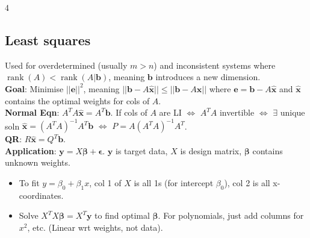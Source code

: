 \documentclass[9pt]{extarticle}
\begin{document}
\begin{multicols*}{4}
\subsection*{Least squares}
Used for overdetermined (usually $m>n$) and inconsistent systems where $\operatorname{rank}(A) < \operatorname{rank}(A|\mathbf{b})$, meaning $\mathbf{b}$ introduces a new dimension.\\
\textbf{Goal}: Minimise $||\mathbf{e}||^{2}$, meaning $||\mathbf{b}-A\hat{\mathbf{x}}|| \leq ||\mathbf{b}-A\mathbf{x}||$ where $\mathbf{e}=\mathbf{b}-A\hat{\mathbf{x}}$ and $\hat{\mathbf{x}}$ contains the optimal weights for cols of $A$.\\
\textbf{Normal Eqn}: $A^{T}A\hat{\mathbf{x}}=A^{T}\mathbf{b}$. If cols of $A$ are LI $\Leftrightarrow$ $A^TA$ invertible $\Leftrightarrow$ $\exists$ unique soln $\hat{\mathbf{x}}=(A^{T}A)^{-1}A^{T}\mathbf{b}$ $\Leftrightarrow$ $P=A(A^{T}A)^{-1}A^{T}$.\\
\textbf{QR}: $R\hat{\mathbf{x}}=Q^{T}\mathbf{b}$.\\
\textbf{Application}: $\mathbf{y}=X\boldsymbol{\beta}+\boldsymbol{\epsilon}$. $\mathbf{y}$ is target data, $X$ is design matrix, $\boldsymbol{\beta}$ contains unknown weights.
\begin{itemize}
    \item To fit $y=\beta_0+\beta_1x$, col 1 of $X$ is all 1s (for intercept $\beta_0$), col 2 is all x-coordinates.
    \item Solve $X^TX\boldsymbol{\beta}=X^T\mathbf{y}$ to find optimal $\boldsymbol{\beta}$. For polynomials, just add columns for $x^2$, etc. (Linear wrt weights, not data).
\end{itemize}



\end{multicols*}
\end{document}
